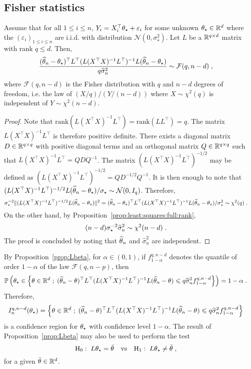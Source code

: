 \subsection*{Fisher statistics}
\begin{shaded}
\begin{proposition}
\label{prop:Lbeta}
Assume that for all $1\leqslant i \leqslant n$, $Y_i = X^\top_i \theta_{\star} + \varepsilon_i$ for some unknown $\theta_\star\in\mathbb{R}^d$ where the $(\varepsilon_i)_{1\leqslant i\leqslant n}$ are i.i.d. with distribution $\mathcal{N}(0,\sigma_\star^2)$. Let $L$ be a $\mathbb{R}^{q\times d}$ matrix with rank $q\leqslant d$. Then,
\[
\frac{(\widehat {\theta}_{n} -\theta_{\star})^\top L^\top(L(X^\top X)^{-1}L^\top)^{-1}L(\widehat {\theta}_{n} -\theta_{\star})}{q\widehat\sigma^2_{n}} \sim \mathcal{F}(q,n-d)\;,
\]
where $\mathcal{F}(q,n-d)$ is the Fisher distribution with $q$ and $n-d$ degrees of freedom, i.e. the law of $(X/q)/(Y/(n-d))$ where $X\sim\chi^2(q)$ is independent of $Y\sim\chi^2(n-d)$.
\end{proposition}
\end{shaded}
\begin{proof}
Note that $\mathrm{rank}(L(X^\top X)^{-1}L^\top) = \mathrm{rank}(LL^\top)  = q$. The matrix $L(X^\top X)^{-1}L^\top$ is therefore positive definite. There exists a diagonal matrix $D\in\mathbb{R}^{q\times q}$ with positive diagonal terms and an orthogonal matrix $Q\in\mathbb{R}^{q\times q}$ such that $L(X^\top X)^{-1}L^\top = QDQ^{-1}$. The matrix $(L(X^\top X)^{-1}L^\top)^{-1/2}$ may be defined as $(L(X^\top X)^{-1}L^\top)^{-1/2} = QD^{-1/2}Q^{-1}$. It is then enough to note that $(L(X^\top X)^{-1}L^\top)^{-1/2}L(\widehat {\theta}_{n} -\theta_{\star})/\sigma_{\star}\sim \mathcal{N}(0,I_q)$. Therefore,
\[
\sigma^{-2}_{\star}\|(L(X^\top X)^{-1}L^\top)^{-1/2}L(\widehat {\theta}_{n} -\theta_{\star})\|^2 = (\widehat {\theta}_{n} -\theta_{\star})^\top L^\top(L(X^\top X)^{-1}L^\top)^{-1}L(\widehat {\theta}_{n} -\theta_{\star})/\sigma^2_{\star} \sim \chi^2(q)\;.
\]
On the other hand, by Proposition~\ref{prop:least:squares:full:rank}, 
\[
(n-d)\sigma^{-2}_{\star}\widehat\sigma^2_{n} \sim \chi^2(n-d)\;.
\]
The proof is concluded by noting that $\widehat {\theta}_n$ and  $\widehat\sigma^2_{n}$ are independent.
\end{proof}
By Proposition~\ref{prop:Lbeta}, for $\alpha\in(0,1)$, if $f_{1-\alpha}^{q,n-d}$ denotes the quantile of order $1-\alpha$ of the law $\mathcal{F}(q,n-p)$, then 
\[
\mathbb{P}\left(\theta_{\star}\in \left\{\theta\in\mathbb{R}^d\;;\; (\widehat {\theta}_{n} -\theta)^\top L^\top(L(X^\top X)^{-1}L^\top)^{-1}L(\widehat {\theta}_{n} -\theta)\leqslant q\widehat\sigma^2_{n}f_{1-\alpha}^{q,n-d}\right\}\right) = 1-\alpha\;.
\]
Therefore, 
\[
I^{q,n-d}_{n}(\theta_{\star}) = \left\{\theta\in\mathbb{R}^d\;;\; (\widehat {\theta}_{n} -\theta)^\top L^\top(L(X^\top X)^{-1}L^\top)^{-1}L(\widehat {\theta}_{n} -\theta)\leqslant q\widehat\sigma^2_{n}f_{1-\alpha}^{q,n-d}\right\}
\]
 is a confidence region for $\theta_{\star}$ with confidence level $1-\alpha$. The result of Proposition~\ref{prop:Lbeta} may also be used to perform the test 
\[
\mathrm{H}_0:\; L\theta_{\star} = \bar{\theta} \quad\mathrm{vs} \quad \mathrm{H}_1:\; L\theta_{\star} \neq \bar {\theta}\;,
\]
for a given $\bar {\theta} \in\mathbb{R}^d$.





